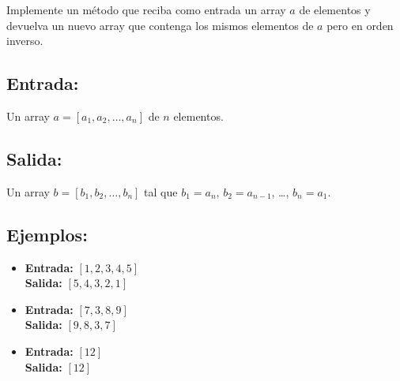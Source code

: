 Implemente un método que reciba como entrada un array \(a\) de elementos y devuelva un nuevo array que contenga los mismos elementos de \(a\) pero en orden inverso.

\subsection*{Entrada:}

Un array \(a = [a_1, a_2, \dots, a_n]\) de \(n\) elementos.

\subsection*{Salida:}

Un array \(b = [b_1, b_2, \dots, b_n]\) tal que \(b_1 = a_n\), \(b_2 = a_{n-1}\), \dots, \(b_n = a_1\).

\subsection*{Ejemplos:}
\begin{itemize}
    \item \textbf{Entrada:} \([1, 2, 3, 4, 5]\) \\
    \textbf{Salida:} \([5, 4, 3, 2, 1]\)
    \item \textbf{Entrada:} \([7, 3, 8, 9]\) \\
    \textbf{Salida:} \([9, 8, 3, 7]\)
    \item \textbf{Entrada:} \([12]\) \\
    \textbf{Salida:} \([12]\)
\end{itemize}
